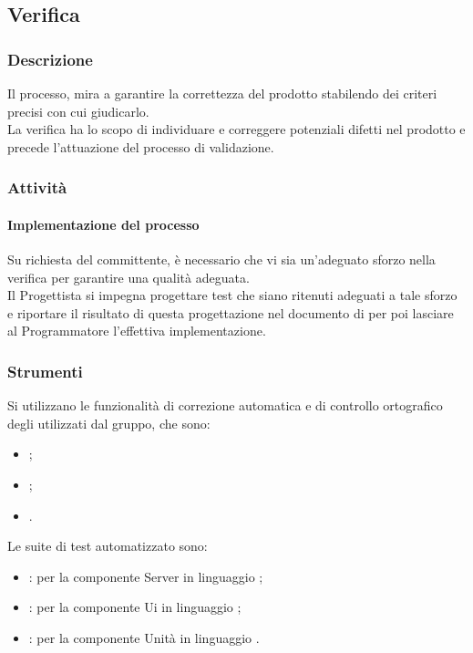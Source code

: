 \subsection{Verifica}
	\subsubsection{Descrizione}
	Il processo, mira a garantire la correttezza del prodotto stabilendo dei criteri precisi con cui giudicarlo.\\
	La verifica ha lo scopo di individuare e correggere potenziali difetti nel prodotto e precede l'attuazione del processo di validazione.

    \subsubsection{Attività}
        \paragraph{Implementazione del processo}
        Su richiesta del committente, è necessario che vi sia un'adeguato sforzo nella verifica per garantire una qualità adeguata.\\
        Il Progettista si impegna progettare test che siano ritenuti adeguati a tale sforzo e riportare il risultato di questa progettazione nel documento di  per poi lasciare al Programmatore l'effettiva implementazione.

	\subsubsection{Strumenti}
	Si utilizzano le funzionalità di correzione automatica e di controllo ortografico degli  utilizzati dal gruppo, che sono:
	\begin{itemize}
		\item {};
		\item {};
		\item {}.
	\end{itemize}
    Le suite di test automatizzato sono:
    \begin{itemize}
        \item {}: per la componente Server in linguaggio ;
        \item {}: per la componente Ui in linguaggio ;
        \item {}: per la componente Unità in linguaggio .
    \end{itemize}

